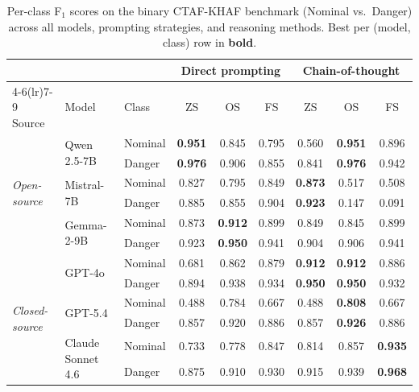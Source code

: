 \begin{table}[ht]
\centering
\caption{Per-class F$_1$ scores on the binary CTAF-KHAF benchmark (Nominal vs.\ Danger) across all models, prompting strategies, and reasoning methods. Best per (model, class) row in \textbf{bold}.}
\label{tab:perclass_binary}
\renewcommand{\arraystretch}{1.10}
\small
\begin{tabular}{l l l *{6}{c}}
\toprule
 & & & \multicolumn{3}{c}{Direct prompting} & \multicolumn{3}{c}{Chain-of-thought} \\
\cmidrule(lr){4-6}\cmidrule(lr){7-9}
Source & Model & Class & ZS & OS & FS & ZS & OS & FS \\
\midrule
  \multirow{6}{*}{\textit{Open-source}} & \multirow{2}{*}{Qwen 2.5-7B} & Nominal & \textbf{0.951} & 0.845 & 0.795 & 0.560 & \textbf{0.951} & 0.896 \\
   &  & Danger & \textbf{0.976} & 0.906 & 0.855 & 0.841 & \textbf{0.976} & 0.942 \\
\cmidrule(lr){2-9}
   & \multirow{2}{*}{Mistral-7B} & Nominal & 0.827 & 0.795 & 0.849 & \textbf{0.873} & 0.517 & 0.508 \\
   &  & Danger & 0.885 & 0.855 & 0.904 & \textbf{0.923} & 0.147 & 0.091 \\
\cmidrule(lr){2-9}
   & \multirow{2}{*}{Gemma-2-9B} & Nominal & 0.873 & \textbf{0.912} & 0.899 & 0.849 & 0.845 & 0.899 \\
   &  & Danger & 0.923 & \textbf{0.950} & 0.941 & 0.904 & 0.906 & 0.941 \\
\midrule
  \multirow{6}{*}{\textit{Closed-source}} & \multirow{2}{*}{GPT-4o} & Nominal & 0.681 & 0.862 & 0.879 & \textbf{0.912} & \textbf{0.912} & 0.886 \\
   &  & Danger & 0.894 & 0.938 & 0.934 & \textbf{0.950} & \textbf{0.950} & 0.932 \\
\cmidrule(lr){2-9}
   & \multirow{2}{*}{GPT-5.4} & Nominal & 0.488 & 0.784 & 0.667 & 0.488 & \textbf{0.808} & 0.667 \\
   &  & Danger & 0.857 & 0.920 & 0.886 & 0.857 & \textbf{0.926} & 0.886 \\
\cmidrule(lr){2-9}
   & \multirow{2}{*}{Claude Sonnet 4.6} & Nominal & 0.733 & 0.778 & 0.847 & 0.814 & 0.857 & \textbf{0.935} \\
   &  & Danger & 0.875 & 0.910 & 0.930 & 0.915 & 0.939 & \textbf{0.968} \\
\bottomrule
\end{tabular}
\end{table}